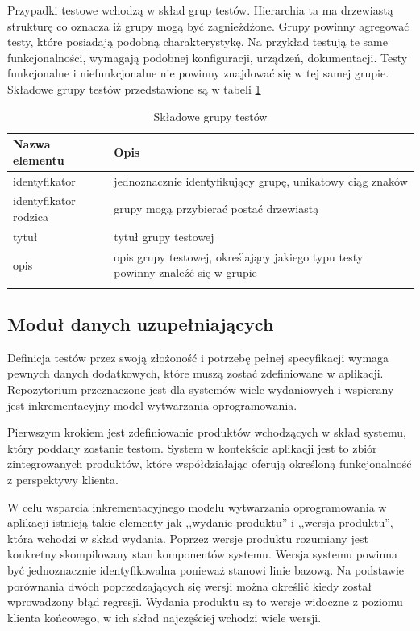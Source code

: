 Przypadki testowe wchodzą w skład grup testów. Hierarchia ta ma drzewiastą strukturę co oznacza iż grupy mogą być zagnieżdżone. Grupy powinny agregować testy, które posiadają podobną charakterystykę. Na przykład testują te same funkcjonalności, wymagają podobnej konfiguracji, urządzeń, dokumentacji. Testy funkcjonalne i niefunkcjonalne nie powinny znajdować się w tej samej grupie. Składowe grupy testów przedstawione są w tabeli \ref{tab:grupaTestow}

\begin{longtable}{| p{6cm}  | p{10cm} |}
 \hline \hline
\textbf{Nazwa elementu} & \textbf{Opis}  \\ \hline
  identyfikator & jednoznacznie identyfikujący grupę, unikatowy ciąg znaków \\ \hline
  identyfikator rodzica & grupy mogą przybierać postać drzewiastą \\ \hline
  tytuł & tytuł grupy testowej \\ \hline
  opis & opis grupy testowej, określający jakiego typu testy powinny znaleźć się w grupie \\ \hline
 \caption{ Składowe grupy testów}
 \label{tab:grupaTestow}
\end{longtable}


\subsection{Moduł danych uzupełniających}

Definicja testów przez swoją złożoność i potrzebę pełnej specyfikacji wymaga pewnych danych dodatkowych, które muszą zostać zdefiniowane w aplikacji. Repozytorium przeznaczone jest dla systemów wiele-wydaniowych i wspierany jest inkrementacyjny model wytwarzania oprogramowania.

Pierwszym krokiem jest zdefiniowanie produktów wchodzących w skład systemu, który poddany zostanie testom. System w kontekście aplikacji jest to zbiór zintegrowanych produktów, które współdziałając oferują określoną funkcjonalność z perspektywy klienta.

W celu wsparcia inkrementacyjnego modelu wytwarzania oprogramowania w aplikacji istnieją takie elementy jak ,,wydanie produktu'' i ,,wersja produktu'', która wchodzi w skład wydania. Poprzez wersje produktu rozumiany jest konkretny skompilowany stan komponentów systemu. Wersja systemu powinna być jednoznacznie identyfikowalna ponieważ stanowi linie bazową. Na podstawie porównania dwóch poprzedzających się wersji można określić kiedy został wprowadzony błąd regresji. Wydania produktu są to wersje widoczne z poziomu klienta końcowego, w ich skład najczęściej wchodzi wiele wersji.

